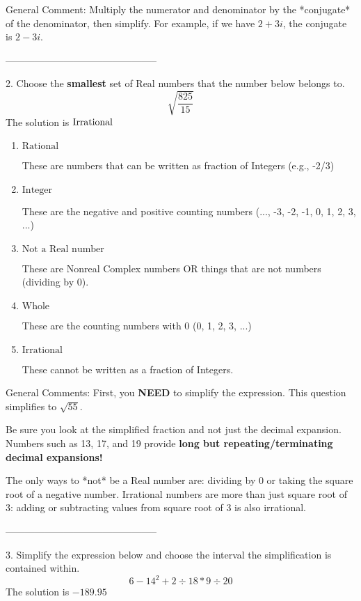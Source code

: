 \documentclass{article}[14pt]
\begin{document}
General Comment: Multiply the numerator and denominator by the *conjugate* of the denominator, then simplify. For example, if we have $2+3i$, the conjugate is $2-3i$.

-----------------------------------------------

2. Choose the \textbf{smallest} set of Real numbers that the number below belongs to.
$$ \sqrt{\frac{825}{15}} $$ 
The solution is $ \text{\text{Irrational}} $ 

\begin{enumerate}[label=\Alph*.] 
\item $ \text{Rational} $ 

 These are numbers that can be written as fraction of Integers (e.g., -2/3) 
\item $ \text{Integer} $ 

 These are the negative and positive counting numbers (..., -3, -2, -1, 0, 1, 2, 3, ...) 
\item $ \text{Not a Real number} $ 

 These are Nonreal Complex numbers OR things that are not numbers (dividing by 0). 
\item $ \text{Whole} $ 

 These are the counting numbers with 0 (0, 1, 2, 3, ...) 
\item $ \text{Irrational} $ 

 These cannot be written as a fraction of Integers. 
\end{enumerate} 
 
General Comments: First, you \textbf{NEED} to simplify the expression. This question simplifies to $\sqrt{55}$. 
 
 Be sure you look at the simplified fraction and not just the decimal expansion. Numbers such as 13, 17, and 19 provide \textbf{long but repeating/terminating decimal expansions!} 
 
 The only ways to *not* be a Real number are: dividing by 0 or taking the square root of a negative number. Irrational numbers are more than just square root of 3: adding or subtracting values from square root of 3 is also irrational.

-----------------------------------------------

3. Simplify the expression below and choose the interval the simplification is contained within.
$$ 6 - 14^2 + 2 \div 18 * 9 \div 20 $$ 
The solution is $ -189.95 $ 
\end{document}
